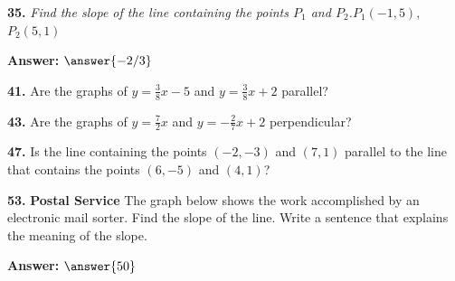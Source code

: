\documentclass{ximera}
\begin{document}
\begin{problem}
\textbf{35.} \emph{Find the slope of the line containing the points $P_1$ and $P_2$.}\quad $P_1(-1, 5)$, $P_2(5, 1)$

\textbf{Answer:} $\answer{-2/3}$
\end{problem}

\begin{problem}
\textbf{41.} Are the graphs of $y = \frac{3}{8}x - 5$ and $y = \frac{3}{8}x + 2$ parallel?

\begin{multipleChoice}
\end{multipleChoice}
\end{problem}

\begin{problem}
\textbf{43.} Are the graphs of $y = \frac{7}{2}x$ and $y = -\frac{2}{7}x + 2$ perpendicular?

\begin{multipleChoice}
\end{multipleChoice}
\end{problem}

\begin{problem}
\textbf{47.} Is the line containing the points $(-2, -3)$ and $(7, 1)$ parallel to the line
  that contains the points $(6, -5)$ and $(4, 1)$?

\begin{multipleChoice}
\end{multipleChoice}
\end{problem}

\begin{problem}
\textbf{53.} \textbf{Postal Service} The graph below shows the work accomplished by an
  electronic mail sorter. Find the slope of the line. Write a sentence that explains the
  meaning of the slope.

\textbf{Answer:} $\answer{50}$
\end{problem}
\end{document}
